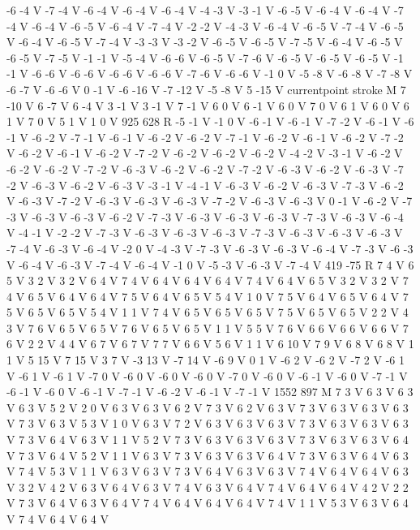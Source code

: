 {-6 -4 V
-7 -4 V
-6 -4 V
-6 -4 V
-6 -4 V
-4 -3 V
-3 -1 V
-6 -5 V
-6 -4 V
-6 -4 V
-7 -4 V
-6 -4 V
-6 -5 V
-6 -4 V
-7 -4 V
-2 -2 V
-4 -3 V
-6 -4 V
-6 -5 V
-7 -4 V
-6 -5 V
-6 -4 V
-6 -5 V
-7 -4 V
-3 -3 V
-3 -2 V
-6 -5 V
-6 -5 V
-7 -5 V
-6 -4 V
-6 -5 V
-6 -5 V
-7 -5 V
-1 -1 V
-5 -4 V
-6 -6 V
-6 -5 V
-7 -6 V
-6 -5 V
-6 -5 V
-6 -5 V
-1 -1 V
-6 -6 V
-6 -6 V
-6 -6 V
-6 -6 V
-7 -6 V
-6 -6 V
-1 0 V
-5 -8 V
-6 -8 V
-7 -8 V
-6 -7 V
-6 -6 V
0 -1 V
-6 -16 V
-7 -12 V
-5 -8 V
5 -15 V
currentpoint stroke M
7 -10 V
6 -7 V
6 -4 V
3 -1 V
3 -1 V
7 -1 V
6 0 V
6 -1 V
6 0 V
7 0 V
6 1 V
6 0 V
6 1 V
7 0 V
5 1 V
1 0 V
925 628 R
-5 -1 V
-1 0 V
-6 -1 V
-6 -1 V
-7 -2 V
-6 -1 V
-6 -1 V
-6 -2 V
-7 -1 V
-6 -1 V
-6 -2 V
-6 -2 V
-7 -1 V
-6 -2 V
-6 -1 V
-6 -2 V
-7 -2 V
-6 -2 V
-6 -1 V
-6 -2 V
-7 -2 V
-6 -2 V
-6 -2 V
-6 -2 V
-4 -2 V
-3 -1 V
-6 -2 V
-6 -2 V
-6 -2 V
-7 -2 V
-6 -3 V
-6 -2 V
-6 -2 V
-7 -2 V
-6 -3 V
-6 -2 V
-6 -3 V
-7 -2 V
-6 -3 V
-6 -2 V
-6 -3 V
-3 -1 V
-4 -1 V
-6 -3 V
-6 -2 V
-6 -3 V
-7 -3 V
-6 -2 V
-6 -3 V
-7 -2 V
-6 -3 V
-6 -3 V
-6 -3 V
-7 -2 V
-6 -3 V
-6 -3 V
0 -1 V
-6 -2 V
-7 -3 V
-6 -3 V
-6 -3 V
-6 -2 V
-7 -3 V
-6 -3 V
-6 -3 V
-6 -3 V
-7 -3 V
-6 -3 V
-6 -4 V
-4 -1 V
-2 -2 V
-7 -3 V
-6 -3 V
-6 -3 V
-6 -3 V
-7 -3 V
-6 -3 V
-6 -3 V
-6 -3 V
-7 -4 V
-6 -3 V
-6 -4 V
-2 0 V
-4 -3 V
-7 -3 V
-6 -3 V
-6 -3 V
-6 -4 V
-7 -3 V
-6 -3 V
-6 -4 V
-6 -3 V
-7 -4 V
-6 -4 V
-1 0 V
-5 -3 V
-6 -3 V
-7 -4 V
419 -75 R
7 4 V
6 5 V
3 2 V
3 2 V
6 4 V
7 4 V
6 4 V
6 4 V
6 4 V
7 4 V
6 4 V
6 5 V
3 2 V
3 2 V
7 4 V
6 5 V
6 4 V
6 4 V
7 5 V
6 4 V
6 5 V
5 4 V
1 0 V
7 5 V
6 4 V
6 5 V
6 4 V
7 5 V
6 5 V
6 5 V
5 4 V
1 1 V
7 4 V
6 5 V
6 5 V
6 5 V
7 5 V
6 5 V
6 5 V
2 2 V
4 3 V
7 6 V
6 5 V
6 5 V
7 6 V
6 5 V
6 5 V
1 1 V
5 5 V
7 6 V
6 6 V
6 6 V
6 6 V
7 6 V
2 2 V
4 4 V
6 7 V
6 7 V
7 7 V
6 6 V
5 6 V
1 1 V
6 10 V
7 9 V
6 8 V
6 8 V
1 1 V
5 15 V
7 15 V
3 7 V
-3 13 V
-7 14 V
-6 9 V
0 1 V
-6 2 V
-6 2 V
-7 2 V
-6 1 V
-6 1 V
-6 1 V
-7 0 V
-6 0 V
-6 0 V
-6 0 V
-7 0 V
-6 0 V
-6 -1 V
-6 0 V
-7 -1 V
-6 -1 V
-6 0 V
-6 -1 V
-7 -1 V
-6 -2 V
-6 -1 V
-7 -1 V
1552 897 M
7 3 V
6 3 V
6 3 V
6 3 V
5 2 V
2 0 V
6 3 V
6 3 V
6 2 V
7 3 V
6 2 V
6 3 V
7 3 V
6 3 V
6 3 V
6 3 V
7 3 V
6 3 V
5 3 V
1 0 V
6 3 V
7 2 V
6 3 V
6 3 V
6 3 V
7 3 V
6 3 V
6 3 V
6 3 V
7 3 V
6 4 V
6 3 V
1 1 V
5 2 V
7 3 V
6 3 V
6 3 V
6 3 V
7 3 V
6 3 V
6 3 V
6 4 V
7 3 V
6 4 V
5 2 V
1 1 V
6 3 V
7 3 V
6 3 V
6 3 V
6 4 V
7 3 V
6 3 V
6 4 V
6 3 V
7 4 V
5 3 V
1 1 V
6 3 V
6 3 V
7 3 V
6 4 V
6 3 V
6 3 V
7 4 V
6 4 V
6 4 V
6 3 V
3 2 V
4 2 V
6 3 V
6 4 V
6 3 V
7 4 V
6 3 V
6 4 V
7 4 V
6 4 V
6 4 V
4 2 V
2 2 V
7 3 V
6 4 V
6 3 V
6 4 V
7 4 V
6 4 V
6 4 V
6 4 V
7 4 V
1 1 V
5 3 V
6 3 V
6 4 V
7 4 V
6 4 V
6 4 V
}
